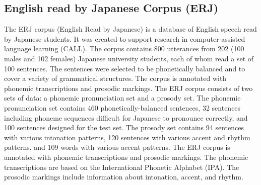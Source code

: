 \subsection{English read by Japanese Corpus (ERJ) \cite{ERJ}}

The ERJ corpus (English Read by Japanese) is a database of English speech read by Japanese students. It was created  to support research in computer-assisted language learning (CALL). The corpus contains 800 utterances from 202 (100 males and 102 females) Japanese university students, each of whom read a set of 100 sentences. The sentences were selected to be phonetically balanced and to cover a variety of grammatical structures. The corpus is annotated with phonemic transcriptions and prosodic markings. The ERJ corpus consists of two sets of data: a phonemic pronunciation set and a prosody set. The phonemic pronunciation set contains 460 phonetically-balanced sentences, 32 sentences including phoneme sequences difficult for Japanese to pronounce correctly, and 100 sentences designed for the test set. The prosody set contains 94 sentences with various intonation patterns, 120 sentences with various accent and rhythm patterns, and 109 words with various accent patterns. The ERJ corpus is annotated with phonemic transcriptions and prosodic markings. The phonemic transcriptions are based on the International Phonetic Alphabet (IPA). The prosodic markings include information about intonation, accent, and rhythm.





